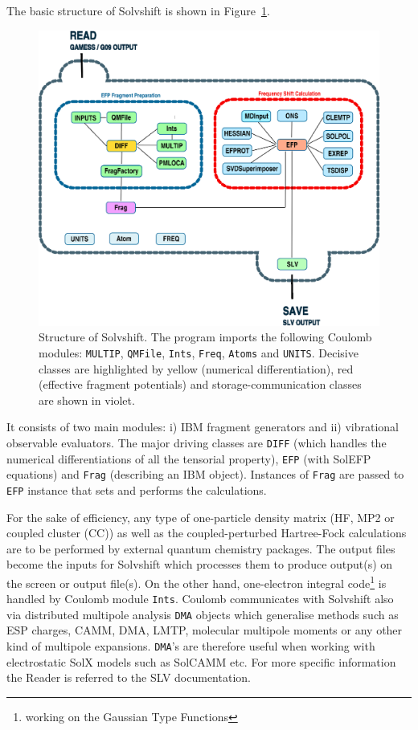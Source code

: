 \documentclass[a4paper,titlepage,twoside,fleqn,12pt]{book}
\begin{document}
\begin{refsection}
The basic structure of {\sc Solvshift} is shown
in Figure~\ref{f:slv-structure}.
%
\begin{figure}[t!]
\centering
\setlength\fboxsep{0.4pt}
\setlength\fboxrule{0.5pt}
\includegraphics[width=0.90\linewidth]{slv-diagram.eps}
\caption{
Structure of {\sc Solvshift}. The program imports the following 
{\sc Coulomb} modules: {\tt MULTIP}, {\tt QMFile}, {\tt Ints}, 
{\tt Freq}, {\tt Atoms} and {\tt UNITS}. Decisive classes
are highlighted by yellow (numerical differentiation), 
red (effective fragment potentials) and storage\hyp{}communication
classes are shown in violet.
\label{f:slv-structure}}
\end{figure}
%
It consists of two main modules: i) IBM fragment generators 
and ii) vibrational observable evaluators. The major driving classes
are {\tt DIFF} (which handles the numerical differentiations of
all the tensorial property), {\tt EFP} (with SolEFP equations)
and {\tt Frag} (describing an IBM object). Instances of {\tt Frag} are passed to
{\tt EFP} instance that sets and performs the calculations.

For the sake of efficiency, any type of one\hyp{}particle
density matrix (HF, MP2 or coupled cluster (CC))
as well as the coupled\hyp{}perturbed Hartree\hyp{}Fock calculations
are to be performed by external quantum chemistry packages.
The output files become the inputs for {\sc Solvshift}
which
processes them to produce output(s) on the screen
or output file(s).
On the other hand, one\hyp{}electron integral 
code\footnote{working on
the Gaussian Type Functions} is handled by {\sc Coulomb}
module \verb+Ints+. {\sc Coulomb} communicates with {\sc Solvshift}
also via distributed multipole analysis \verb+DMA+ objects which generalise
methods such as ESP charges, CAMM, DMA, LMTP, molecular multipole
moments or any other kind of multipole expansions. 
\verb+DMA+'s are therefore useful when working with
electrostatic SolX models such as SolCAMM etc.
For more specific information the Reader is referred 
to the SLV documentation.


\end{refsection}
\end{document}
